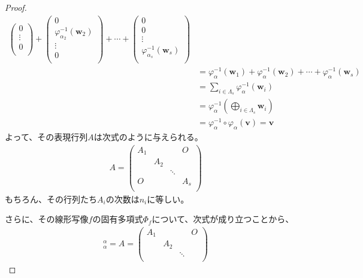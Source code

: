 \documentclass[dvipdfmx]{jsarticle}
\begin{document}
\begin{proof}
\begin{align*}
\begin{pmatrix}
0 \\
 \vdots \\
0 \\
\end{pmatrix} + \begin{pmatrix}
0 \\
\varphi_{\alpha_{2}}^{- 1}\left( \mathbf{w}_{2} \right) \\
 \vdots \\
0 \\
\end{pmatrix} + \cdots + \begin{pmatrix}
0 \\
0 \\
 \vdots \\
\varphi_{\alpha_{s}}^{- 1}\left( \mathbf{w}_{s} \right) \\
\end{pmatrix}\\
&= \varphi_{\alpha}^{- 1}\left( \mathbf{w}_{1} \right) + \varphi_{\alpha}^{- 1}\left( \mathbf{w}_{2} \right) + \cdots + \varphi_{\alpha}^{- 1}\left( \mathbf{w}_{s} \right)\\
&= \sum_{i \in \varLambda_{s}} {\varphi_{\alpha}^{- 1}\left( \mathbf{w}_{i} \right)}\\
&= \varphi_{\alpha}^{- 1}\left( \bigoplus_{i \in \varLambda_{s}} \mathbf{w}_{i} \right)\\
&= \varphi_{\alpha}^{- 1} \circ \varphi_{\alpha}\left( \mathbf{v} \right) = \mathbf{v}
\end{align*}
よって、その表現行列$A$は次式のように与えられる。
\begin{align*}
A = \begin{pmatrix}
A_{1} & \  & \  & O \\
\  & A_{2} & \  & \  \\
\  & \  & \ddots & \  \\
O & \  & \  & A_{s} \\
\end{pmatrix}
\end{align*}
もちろん、その行列たち$A_{i}$の次数は$n_{i}$に等しい。\par
さらに、その線形写像$f$の固有多項式$\varPhi_{f}$について、次式が成り立つことから、
\begin{align*}
[ f]_{\alpha}^{\alpha} = A = \begin{pmatrix}
A_{1} & \  & \  & O \\
\  & A_{2} & \  & \  \\
\  & \  & \ddots & \  \\

\end{pmatrix}
\end{align*}
\end{proof}
\end{document}
